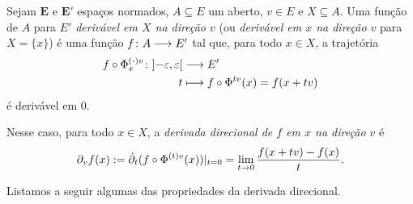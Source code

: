 \begin{comment}

\begin{definition}
Sejam $(\bm E,\nor{\var})$ um espaço normado, $A \subseteq E$ um aberto, $v \in E$ e $x \in A$. Uma função de $A$ para $\R$ \emph{derivável em $x$ na direção $v$} é uma função $\fun{f}{A}{\R}$ tal que existe o limite
	\begin{equation*}
	\lim_{t \to 0} \frac{f(x+tv)-f(x)}{t}.
	\end{equation*}
Nesse caso, a \emph{derivada direcional de $f$ em $x$ na direção $v$} é
	\begin{equation*}
	\dir{v} f(x) := \lim_{t \to 0} \frac{f(x+tv)-f(x)}{t}.
	\end{equation*}
\end{definition}

\end{comment}

\begin{definition}
Sejam $\bm E$ e $\bm E'$ espaços normados, $A \subseteq E$ um aberto, $v \in E$ e $X \subseteq A$. Uma função de $A$ para $E'$ \emph{derivável em $X$ na direção $v$} (ou \emph{derivável em $x$ na direção $v$} para $X=\{x\}$) é uma função $f\colon \allowbreak A \longrightarrow E'$ tal que, para todo $x \in X$, a trajetória
	\begin{align*}
	{f \circ {\Phi}^{{(\bm{\cdot})}{v}}_{x}}\colon {\left]-\varepsilon,\allowbreak \varepsilon\right[} &\longrightarrow {E'} \\{t} &\longmapsto f \circ {\Phi}^{{t}{v}}(x) = f(x+tv)
	\end{align*}
é derivável em $0$.

Nesse caso, para todo $x \in X$, a \emph{derivada direcional de $f$ em $x$ na direção $v$} é
	\begin{equation*}
	\partial_{v} f(x) := \dot{\partial}_{t}( f \circ {\Phi}^{{(t)}{v}}(x))|_{t=0} = \lim_{t \to 0} \frac{f(x+tv)-f(x)}{t}.
	\end{equation*}
\end{definition}

Listamos a seguir algumas das propriedades da derivada direcional.

